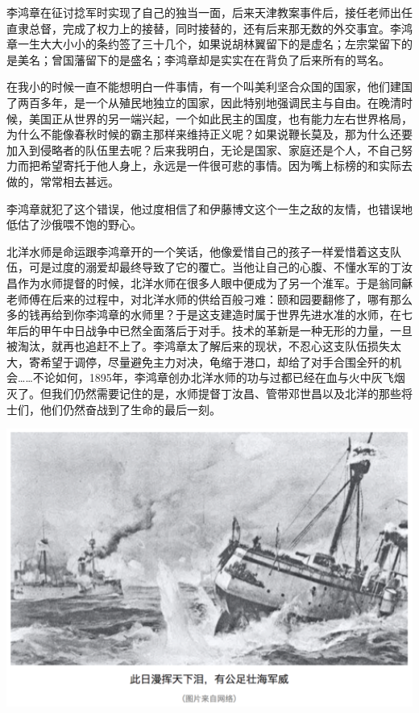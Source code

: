 \documentclass[]{book}
\begin{document}
李鸿章在征讨捻军时实现了自己的独当一面，后来天津教案事件后，接任老师出任直隶总督，完成了权力上的接替，同时接替的，还有后来那无数的外交事宜。李鸿章一生大大小小的条约签了三十几个，如果说胡林翼留下的是虚名；左宗棠留下的是美名；曾国藩留下的是盛名；李鸿章却是实实在在背负了后来所有的骂名。

在我小的时候一直不能想明白一件事情，有一个叫美利坚合众国的国家，他们建国了两百多年，是一个从殖民地独立的国家，因此特别地强调民主与自由。在晚清时候，美国正从世界的另一端兴起，一个如此民主的国度，也有能力左右世界格局，为什么不能像春秋时候的霸主那样来维持正义呢？如果说鞭长莫及，那为什么还要加入到侵略者的队伍里去呢？后来我明白，无论是国家、家庭还是个人，不自己努力而把希望寄托于他人身上，永远是一件很可悲的事情。因为嘴上标榜的和实际去做的，常常相去甚远。

李鸿章就犯了这个错误，他过度相信了和伊藤博文这个一生之敌的友情，也错误地低估了沙俄喂不饱的野心。

北洋水师是命运跟李鸿章开的一个笑话，他像爱惜自己的孩子一样爱惜着这支队伍，可是过度的溺爱却最终导致了它的覆亡。当他让自己的心腹、不懂水军的丁汝昌作为水师提督的时候，北洋水师在很多人眼中便成为了另一个淮军。于是翁同龢老师傅在后来的过程中，对北洋水师的供给百般刁难：颐和园要翻修了，哪有那么多的钱再给到你李鸿章的水师里？于是这支建造时属于世界先进水准的水师，在七年后的甲午中日战争中已然全面落后于对手。技术的革新是一种无形的力量，一旦被淘汰，就再也追赶不上了。李鸿章太了解后来的现状，不忍心这支队伍损失太大，寄希望于调停，尽量避免主力对决，龟缩于港口，却给了对手合围全歼的机会\ldots{}\ldots{}不论如何，1895年，李鸿章创办北洋水师的功与过都已经在血与火中灰飞烟灭了。但我们仍然需要记住的是，水师提督丁汝昌、管带邓世昌以及北洋的那些将士们，他们仍然奋战到了生命的最后一刻。

\includegraphics[width=6.67in]{images/his4}
\end{document}
